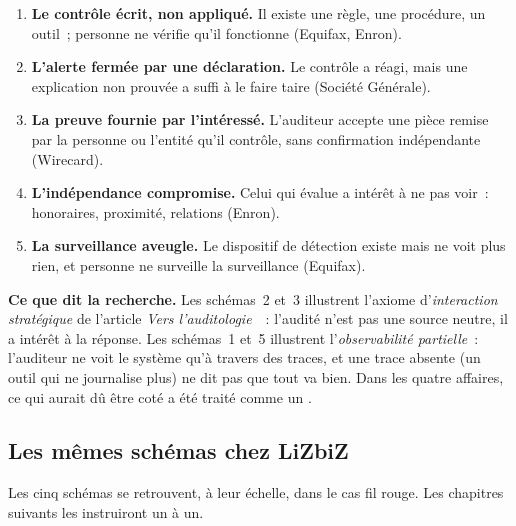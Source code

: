 \begin{enumerate}
    \item \textbf{Le contrôle écrit, non appliqué.} Il existe une règle, une
          procédure, un outil~; personne ne vérifie qu'il fonctionne
          (Equifax, Enron).
    \item \textbf{L'alerte fermée par une déclaration.} Le contrôle a
          réagi, mais une explication non prouvée a suffi à le faire taire
          (Société Générale).
    \item \textbf{La preuve fournie par l'intéressé.} L'auditeur accepte une
          pièce remise par la personne ou l'entité qu'il contrôle, sans
          confirmation indépendante (Wirecard).
    \item \textbf{L'indépendance compromise.} Celui qui évalue a intérêt à
          ne pas voir~: honoraires, proximité, relations (Enron).
    \item \textbf{La surveillance aveugle.} Le dispositif de détection
          existe mais ne voit plus rien, et personne ne surveille la
          surveillance (Equifax).
\end{enumerate}

\begin{boxinfo}
\textbf{Ce que dit la recherche.} Les schémas~2 et~3 illustrent l'axiome
d'\emph{interaction stratégique} de l'article \emph{Vers
l'auditologie}~\cite{minka2026auditologie}~: l'audité n'est pas une source
neutre, il a intérêt à la réponse. Les schémas~1 et~5 illustrent
l'\emph{observabilité partielle}~: l'auditeur ne voit le système qu'à
travers des traces, et une trace absente (un outil qui ne journalise plus)
ne dit pas que tout va bien. Dans les quatre affaires, ce qui aurait dû
être coté \NEK{} a été traité comme un \OUI{}.
\end{boxinfo}

\subsection{Les mêmes schémas chez LiZbiZ}

Les cinq schémas se retrouvent, à leur échelle, dans le cas fil rouge.
Les chapitres suivants les instruiront un à un.

